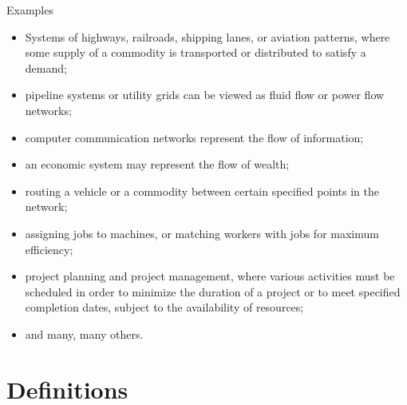 \documentclass[c]{beamer}
\begin{document}
\begin{frame}{Examples}
\begin{itemize}
    \item Systems of highways, railroads, shipping lanes, or aviation patterns, where some supply of a commodity is transported or distributed to satisfy a demand;
    \item pipeline systems or utility grids can be viewed as fluid flow or power flow networks;
    \item computer communication networks represent the flow of information;
    \item an economic system may represent the flow of wealth;
    \item routing a vehicle or a commodity between certain specified points in the network; 
    \item assigning jobs to machines, or matching workers with jobs for maximum efficiency; 
    \item project planning and project management, where various activities must be scheduled in order to minimize the duration of a project or to meet specified completion dates, subject to the availability of resources;
    \item and many, many others.
\end{itemize}
\end{frame}

\section{Definitions}
\end{document}
